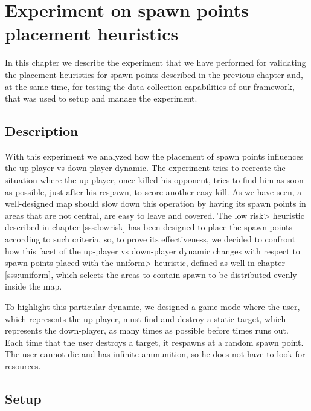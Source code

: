 \chapter{Experiment on spawn points placement heuristics}


In this chapter we describe the experiment that we have performed for validating the placement heuristics for spawn points described in the previous chapter and, at the same time, for testing the data-collection capabilities of our framework, that was used to setup and manage the experiment.


\section{Description}

With this experiment we analyzed how the placement of spawn points influences the up-player vs down-player dynamic. The experiment tries to recreate the situation where the up-player, once killed his opponent, tries to find him as soon as possible, just after his respawn, to score another easy kill. As we have seen, a well-designed map should slow down this operation by having its spawn points in areas that are not central, are easy to leave and covered. The \<low risk> heuristic described in chapter \ref{sss:lowrisk} has been designed to place the spawn points according to such criteria, so, to prove its effectiveness, we decided to confront how this facet of the up-player vs down-player dynamic changes with respect to spawn points placed with the \<uniform> heuristic, defined as well in chapter \ref{sss:uniform}, which selects the areas to contain spawn to be distributed evenly inside the map.

\par

To highlight this particular dynamic, we designed a game mode where the user, which represents the up-player, must find and destroy a static target, which represents the down-player, as many times as possible before times runs out. Each time that the user destroys a target, it respawns at a random spawn point. The user cannot die and has infinite ammunition, so he does not have to look for resources.


\section{Setup}

